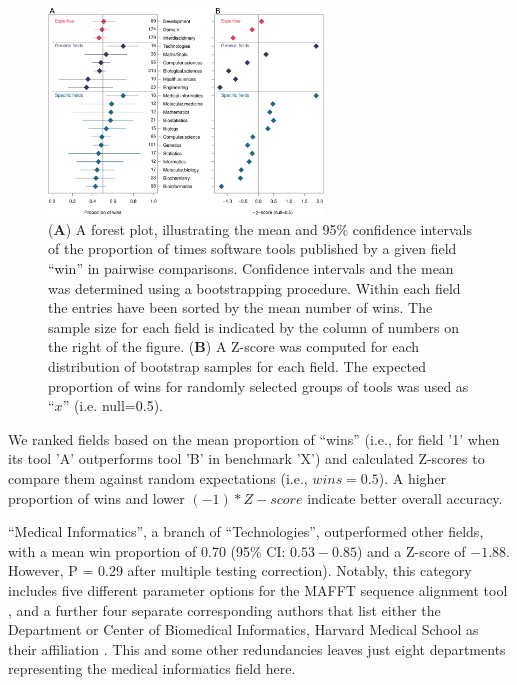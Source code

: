 \documentclass[fleqn,10pt,doc,onecolumn]{SelfArx}%
\begin{document}
\begin{figure}[ht!]
\begin{center}
  \includegraphics[width=0.65\textwidth]{figure2.pdf}
\end{center}
\caption{(\textbf{A}) A forest plot, illustrating the mean and 95\%
  confidence intervals of the proportion of times software tools
  published by a given field ``win'' in pairwise
  comparisons. Confidence intervals and the mean was determined using
  a bootstrapping procedure. Within each field the entries have been
  sorted by the mean number of wins. The sample size for each field is
  indicated by the column of numbers on the right of the figure.
  (\textbf{B}) A Z-score was computed for each distribution of
  bootstrap samples for each field. The expected proportion of wins
  for randomly selected groups of tools was used as ``$x$''
  (i.e. null=0.5).}
\label{fig:fig2}
\end{figure}


We ranked fields based on the mean proportion of ``wins'' (i.e., for field '1' when its tool
'A' outperforms tool 'B' in benchmark 'X') and calculated Z-scores
to compare them against random expectations (i.e., $wins = 0.5$). A
higher proportion of wins and lower $(-1) * Z-score$ indicate better
overall accuracy.

``Medical Informatics'', a branch of ``Technologies'', outperformed
other fields, with a mean win proportion of 0.70 (95\% CI:
$0.53-0.85$) and a Z-score of $-1.88$. However, P = 0.29 after
multiple testing correction). Notably, this category includes five
different parameter options for the MAFFT sequence alignment tool
\cite{katoh2008recent}, and a further four separate corresponding
authors that list either the Department or Center of Biomedical
Informatics, Harvard Medical School as their affiliation
\cite{kim2010rsw,yang2013diverse,kharchenko2014bayesian,ruan2020fast}. This
and some other redundancies leaves just eight departments
representing the medical informatics field here.
\end{document}
